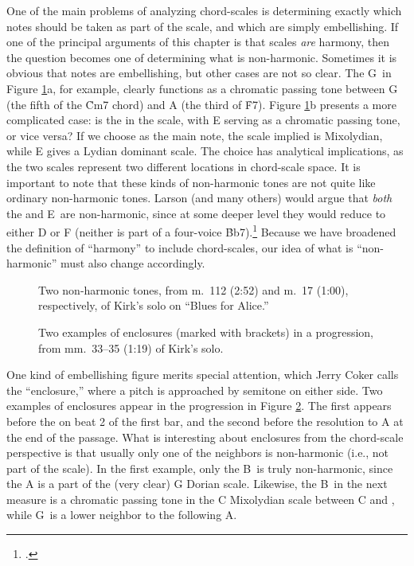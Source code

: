 One of the main problems of analyzing chord-scales is determining exactly
which notes should be taken as part of the scale, and which are simply
embellishing. If one of the principal arguments of this chapter is that scales
\emph{are} harmony, then the question becomes one of determining what is
non-harmonic. Sometimes it is obvious that notes are embellishing, but other
cases are not so clear. The G\sharp\ in Figure \ref{csa:non-harmonic-tones}a,
for example, clearly functions as a chromatic passing tone between G (the
fifth of the \h{Cm7} chord) and A (the third of \h{F7}). Figure
\ref{csa:non-harmonic-tones}b presents a more complicated case: is the \Eflat
in the scale, with E\nat{} serving as a chromatic passing tone, or vice versa?
If we choose \Eflat as the main note, the scale implied is \Bflat Mixolydian,
while E\nat{} gives a \Bflat Lydian dominant scale. The choice has analytical
implications, as the two scales represent two different locations in
chord-scale space. It is important to note that these kinds of non-harmonic
tones are not quite like ordinary non-harmonic tones. Larson (and many others)
would argue that \emph{both} the \Eflat and E\nat\ are non-harmonic, since at
some deeper level they would reduce to either D or F (neither is part of a four-voice
\h{Bb7}).\footcite[5--10]{larson:2009} Because we have broadened the
definition of ``harmony'' to include chord-scales, our idea of what is
``non-harmonic'' must also change accordingly.

\begin{figure}[tbp]
  \caption[Two non-harmonic tones in Kirk's solo.]{Two non-harmonic tones, from
    m.~112 (2:52) and m.~17 (1:00), respectively, of Kirk's solo on ``Blues for Alice.''}
  \label{csa:non-harmonic-tones}
\end{figure}

\begin{figure}[tbp]
  \caption[Two examples of enclosures in a \tfo progression.]{Two examples of
    enclosures (marked with brackets) in a \tfo progression, from mm.~33--35
    (1:19) of Kirk's solo.}
  \label{csa:enclosures}
\end{figure}

One kind of embellishing figure merits special attention, which Jerry Coker
calls the ``enclosure,'' where a pitch is approached by semitone on either
side. Two examples of enclosures appear in the \tfo progression in
Figure \ref{csa:enclosures}. The first appears before the \Bflat on beat 2 of
the first bar, and the second before the resolution to A at the end of the
passage. What is interesting about enclosures from the chord-scale perspective
is that usually only one of the neighbors is non-harmonic (i.e., not part of
the scale). In the first example, only the B\nat\ is truly non-harmonic, since
the A is a part of the (very clear) G Dorian scale. Likewise, the B\nat\ in
the next measure is a chromatic passing tone in the C Mixolydian scale between
C and \Bflat, while G\sharp\ is a lower neighbor to the following A.

